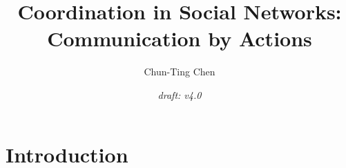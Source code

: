 \documentclass[12pt,letter]{article}
\theoremstyle{definition}
\theoremstyle{remark}
\theoremstyle{claim}
\begin{document}

\title {Coordination in Social Networks: Communication by Actions}
\author {Chun-Ting Chen}
\date{\textit{draft: v4.0}}
\maketitle

\begin{abstract}





\end{abstract}


\section{Introduction} 
\end{document}
